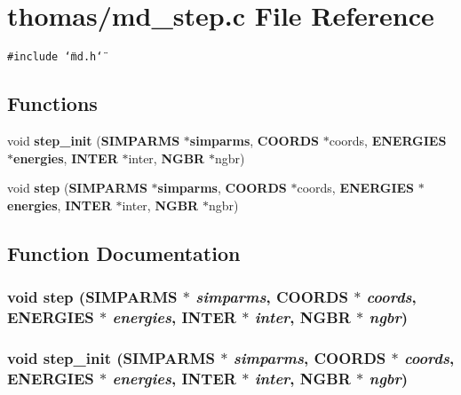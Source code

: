 \section{thomas/md\_\-step.c File Reference}
\label{thomas_2md__step_8c}
{\tt \#include \char`\"{}md.h\char`\"{}}\par
\subsection*{Functions}
\begin{CompactItemize}
\item 
void {\bf step\_\-init} ({\bf SIMPARMS} $\ast${\bf simparms}, {\bf COORDS} $\ast$coords, {\bf ENERGIES} $\ast${\bf energies}, {\bf INTER} $\ast$inter, {\bf NGBR} $\ast$ngbr)
\item 
void {\bf step} ({\bf SIMPARMS} $\ast${\bf simparms}, {\bf COORDS} $\ast$coords, {\bf ENERGIES} $\ast${\bf energies}, {\bf INTER} $\ast$inter, {\bf NGBR} $\ast$ngbr)
\end{CompactItemize}


\subsection{Function Documentation}
\subsubsection{\setlength{\rightskip}{0pt plus 5cm}void step ({\bf SIMPARMS} $\ast$ {\em simparms}, {\bf COORDS} $\ast$ {\em coords}, {\bf ENERGIES} $\ast$ {\em energies}, {\bf INTER} $\ast$ {\em inter}, {\bf NGBR} $\ast$ {\em ngbr})}\label{thomas_2md__step_8c_2405c06531eef5b1c503a751e872f78f}


\subsubsection{\setlength{\rightskip}{0pt plus 5cm}void step\_\-init ({\bf SIMPARMS} $\ast$ {\em simparms}, {\bf COORDS} $\ast$ {\em coords}, {\bf ENERGIES} $\ast$ {\em energies}, {\bf INTER} $\ast$ {\em inter}, {\bf NGBR} $\ast$ {\em ngbr})}\label{thomas_2md__step_8c_890abff59693b4be532456eecd2eeb0b}



